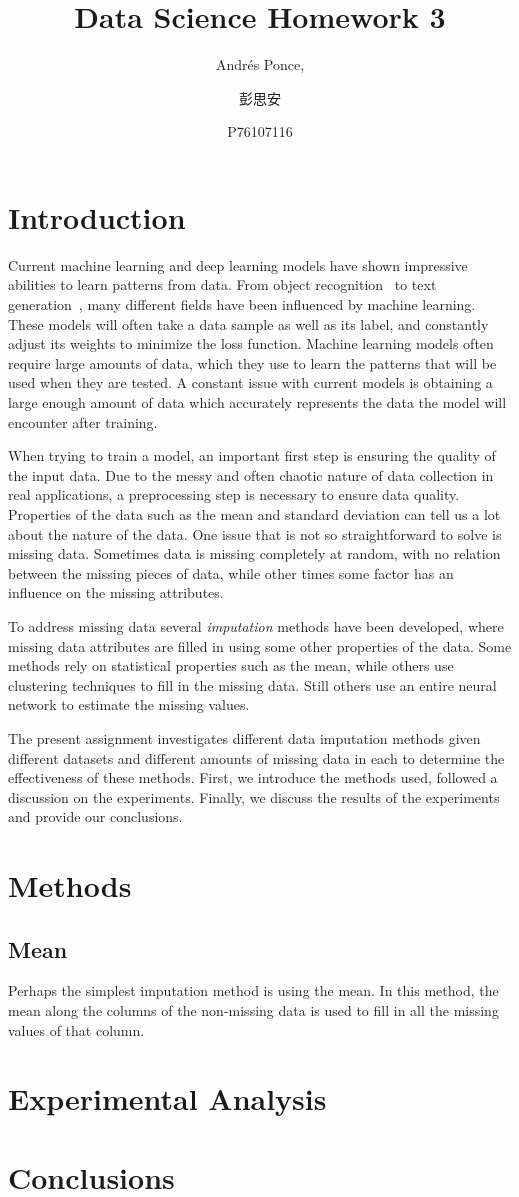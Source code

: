 \documentclass[12pt]{article}
\begin{document}
\title{Data Science Homework 3}
\author{Andr\'es Ponce,
\and
彭思安
\and
P76107116
}
\maketitle
\section{Introduction}
Current machine learning and deep learning models have shown impressive
abilities to learn patterns from data.
From object recognition~\cite{he2016deep} to text generation~\cite{brown2020language},
many different fields have been influenced by machine learning.
These models will often take a data sample as well as its label, and
constantly adjust its weights to minimize the loss function.
Machine learning models often require large amounts of data, which they
use to learn the patterns that will be used when they are tested.
A constant issue with current models is obtaining a large enough amount
of data which accurately represents the data the model will encounter 
after training.

When trying to train a model, an important first step is ensuring the quality
of the input data.
Due to the messy and often chaotic nature of data collection in real 
applications, a preprocessing step is necessary to ensure data quality.
Properties of the data such as the mean and standard deviation can tell
us a lot about the nature of the data.
One issue that is not so straightforward to solve is missing data.
Sometimes data is missing completely at random, with no relation 
between the missing pieces of data, while other times some
factor has an influence on the missing attributes.

To address missing data several \emph{imputation} methods have been 
developed, where missing data attributes are filled in using some other
properties of the data.
Some methods rely on statistical properties such as the mean, while
others use clustering techniques to fill in the missing data.
Still others use an entire neural network to estimate the missing values.

The present assignment investigates different data imputation methods
given different datasets and different amounts of missing data in each
to determine the effectiveness of these methods.
First, we introduce the methods used, followed a discussion on the 
experiments.
Finally, we discuss the results of the experiments and provide our
conclusions.

\section{Methods}
\subsection{Mean}
Perhaps the simplest imputation method is using the mean.
In this method, the mean along the columns of the non-missing data
is used to fill in all the missing values of that column.


\section{Experimental Analysis}
\section{Conclusions}

\printbibliography
\end{document}
